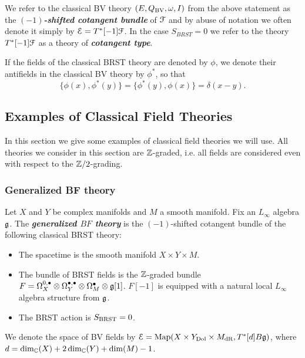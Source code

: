 \documentclass[10pt, oneside]{article}
\newcommand{\defterm}[1]{\textbf{\emph{#1}}}
\begin{document}
We refer to the classical BV theory $(E, Q_{\mathrm{BV}}, \omega, I)$ from the above statement as the \defterm{$(-1)$-shifted cotangent bundle} of $\mathcal F$ and by abuse of notation we often denote it simply by $\mathcal E = T^*[-1] \mathcal F$. In the case $S_{BRST} = 0$ we refer to the theory $T^*[-1] \mathcal F$ as a theory of \defterm{cotangent type}.

If the fields of the classical BRST theory are denoted by $\phi$, we denote their antifields in the classical BV theory by $\phi^*$, so that
\[\{\phi(x), \phi^*(y)\} = \{\phi^*(y), \phi(x)\} = \delta(x-y).\]
\subsection{Examples of Classical Field Theories}

In this section we give some examples of classical field theories we will use. All theories we consider in this section are $\mathbb Z$-graded, i.e. all fields are considered even with respect to the $\mathbb Z/2$-grading.

\subsubsection{Generalized BF theory} \label{gen_BF_section}

\begin{definition}
Let $X$ and $Y$ be complex manifolds and $M$ a smooth manifold. Fix an $L_\infty$ algebra $\mathfrak g$. The \defterm{generalized $BF$ theory} is the $(-1)$-shifted cotangent bundle of the following classical BRST theory:
\begin{itemize}
\item The spacetime is the smooth manifold $X\times Y\times M$.

\item The bundle of BRST fields is the $\mathbb Z$-graded bundle $F = \Omega^{0,\bullet}_X \otimes \Omega^{\bullet,\bullet}_Y \otimes \Omega^\bullet_M \otimes \mathfrak g[1]$. $F[-1]$ is equipped with a natural local $L_\infty$ algebra structure from $\mathfrak g$.

\item The BRST action is $S_{\mathrm{BRST}} = 0$.
\end{itemize}
We denote the space of BV fields by $\mathcal E = \operatorname{Map}(X\times Y_{\mathrm{Dol}}\times M_{\mathrm{dR}}, T^*[d] B\mathfrak g)$, where $d = \dim_\mathbb C(X) + 2\dim_\mathbb C(Y) + \dim(M) - 1$.
\label{def:generalizedBF}
\end{definition}
\end{document}
